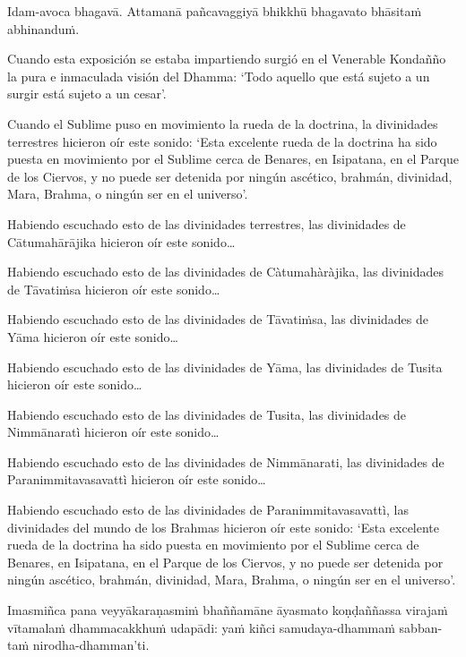 Idam-avoca bhagavā. Attamanā pañcavaggiyā bhikkhū bhagavato bhāsitaṁ
abhinanduṁ.

\clearpage

\englishText
\markboth{\englishTitle}{\rightmark}

Cuando esta exposición se estaba impartiendo surgió en el Venerable Kondañño la pura e inmaculada visión del Dhamma: ‘Todo aquello que está sujeto a un surgir está sujeto a un cesar’.

Cuando el Sublime puso en movimiento la rueda de la doctrina, la divinidades terrestres hicieron oír este sonido: ‘Esta excelente rueda de la doctrina ha sido puesta en movimiento por el Sublime cerca de Benares, en Isipatana, en el Parque de los Ciervos, y no puede ser detenida por ningún ascético, brahmán, divinidad, Mara, Brahma, o ningún ser en el universo’.

Habiendo escuchado esto de las divinidades terrestres, las divinidades de Cātumahārājika hicieron oír este sonido\ldots

Habiendo escuchado esto de las divinidades de Càtumahàràjika, las divinidades de Tāvatiṁsa hicieron oír este sonido\ldots

Habiendo escuchado esto de las divinidades de Tāvatiṁsa, las divinidades de Yāma hicieron oír este sonido\ldots  

Habiendo escuchado esto de las divinidades de Yāma, las divinidades de Tusita hicieron oír este sonido\ldots

Habiendo escuchado esto de las divinidades de Tusita, las divinidades de Nimmānaratì hicieron oír este sonido\ldots

Habiendo escuchado esto de las divinidades de Nimmānarati, las divinidades de Paranimmitavasavattì hicieron oír este sonido\ldots

Habiendo escuchado esto de las divinidades de Paranimmitavasavattì, las divinidades del mundo de los Brahmas hicieron oír este sonido: ‘Esta excelente rueda de la doctrina ha sido puesta en movimiento por el Sublime cerca de Benares, en Isipatana, en el Parque de los Ciervos, y no puede ser detenida por ningún ascético, brahmán, divinidad, Mara, Brahma, o ningún ser en el universo’.



\clearpage

\paliText
\markboth{\paliTitle}{\rightmark}

Imasmiñca pana veyyākaraṇasmiṁ bhaññamāne āyasmato koṇḍaññassa virajaṁ
vītamalaṁ dhammacakkhuṁ udapādi: yaṁ kiñci samudaya-dhammaṁ sabban-taṁ
nirodha-dhamman'ti.

